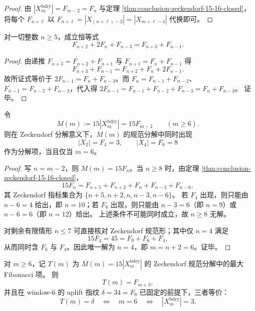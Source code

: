 \begin{proof}
由 \(|X_m^{\mathrm{bdry}}|=F_{m-2}=F_n\) 与定理 \ref{thm:conclusion-zeckendorf-15-16-closed}，将每个 \(F_{n+\ell}\) 以
\(
F_{n+\ell}=|X_{(n+\ell)-2}|=|X_{m+\ell-4}|
\)
代换即可。
\end{proof}

\begin{proposition}[ \(15\to 16\) 补全的尺度无关进位律]\label{prop:conclusion-zeckendorf-15to16-carry}
对一切整数 \(n\ge 5\)，成立恒等式
\[
F_{n+2}+2F_n+F_{n-3}=F_{n+3}+F_{n-1}.
\]
\end{proposition}

\begin{proof}
由递推 \(F_{n+3}=F_{n+2}+F_{n+1}\) 与 \(F_{n+1}=F_n+F_{n-1}\) 得
\[
F_{n+3}+F_{n-1}=F_{n+2}+F_n+2F_{n-1}.
\]
故所证式等价于 \(2F_{n-1}=F_n+F_{n-3}\)。而 \(F_n=F_{n-1}+F_{n-2}\)、\(F_{n-1}=F_{n-2}+F_{n-3}\)，代入得
\(
2F_{n-1}=F_{n-1}+F_{n-2}+F_{n-3}=F_n+F_{n-3}
\)。
证毕。
\end{proof}

\begin{theorem}[Zeckendorf 可见层的分辨率锁定：仅在 \(m=6\) 同时显化 \(|X_2|\) 与 \(|X_4|\)]\label{thm:conclusion-zeckendorf-resolution-lock-m6}
令
\[
M(m):=15|X_m^{\mathrm{bdry}}|=15F_{m-2}\qquad(m\ge 6).
\]
则在 Zeckendorf 分解意义下，\(M(m)\) 的规范分解中同时出现
\[
|X_2|=F_4=3,
\qquad
|X_4|=F_6=8
\]
作为分解项，当且仅当 \(m=6\)。
\end{theorem}

\begin{proof}
写 \(n=m-2\)，则 \(M(m)=15F_n\)。当 \(n\ge 8\) 时，由定理 \ref{thm:conclusion-zeckendorf-15-16-closed}，
\[
15F_n=F_{n+5}+F_{n+2}+F_n+F_{n-3}+F_{n-6},
\]
其 Zeckendorf 指标集合为 \(\{n+5,n+2,n,n-3,n-6\}\)。
若 \(F_4\) 出现，则只能由 \(n-6=4\) 给出，即 \(n=10\)；若 \(F_6\) 出现，则只能由 \(n-3=6\)（即 \(n=9\)）或 \(n-6=6\)（即 \(n=12\)）给出。
上述条件不可能同时成立，故 \(n\ge 8\) 无解。

对剩余有限情形 \(n\le 7\) 可直接核对 Zeckendorf 规范形；其中仅 \(n=4\) 满足
\[
15F_4=45=F_9+F_6+F_4,
\]
从而同时含 \(F_6\) 与 \(F_4\)。因此唯一解为 \(n=4\)，即 \(m=n+2=6\)。证毕。
\end{proof}

\begin{proposition}[\texorpdfstring{$\delta=34$}{δ=34} 与 \(m=6\) 的算术同一化：由顶层 Zeckendorf 权重反推分辨率]\label{prop:conclusion-delta34-top-zeckendorf-implies-m6}
对 \(m\ge 6\)，记 \(T(m)\) 为 \(M(m)=15|X_m^{\mathrm{bdry}}|\) 的 Zeckendorf 规范分解中的最大 Fibonacci 项。
则
\[
T(m)=F_{m+3},
\]
并且在 window-\(6\) 的 uplift 指纹 \(\delta=34=F_9\) 已固定的前提下，三者等价：
\[
T(m)=\delta
\quad\Longleftrightarrow\quad
m=6
\quad\Longleftrightarrow\quad
|X_m^{\mathrm{bdry}}|=3.
\]
\end{proposition}

